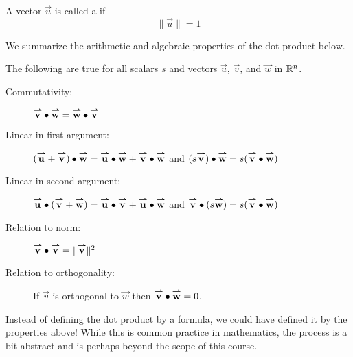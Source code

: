 \documentclass{ximera}
\begin{document}
\begin{definition}
  A vector $\vec{u}$ is called a  if
  \[
  \|\vec{u}\| = 1
  \]
\end{definition}






We summarize the arithmetic and algebraic properties of the dot
product below.
\begin{theorem}
  The following are true for all scalars $s$ and vectors
  $\vec{u}$, $\vec{v}$, and $\vec{w}$ in $\R^n$.
  \begin{description}
  \item[Commutativity:] $\vec{v} \dotp \vec{w} = \vec{w} \dotp
    \vec{v}$
  \item[Linear in first argument:] $(\vec{u}+\vec{v})\dotp \vec{w} = \vec{u}\dotp \vec{w} +
    \vec{v}\dotp \vec{w}$ and $(s\vec{v})\dotp \vec{w} = s(\vec{v}
    \dotp \vec{w})$
  \item[Linear in second argument:] $\vec{u} \dotp (\vec{v}+\vec{w}) = \vec{u}\dotp \vec{v}+
    \vec{u}\dotp \vec{w}$ and $\vec{v} \dotp (s\vec{w}) = s(\vec{v}
    \dotp \vec{w})$
  \item[Relation to norm:] $\vec{v} \dotp \vec{v} = \|\vec{v}\|^2$
  \item[Relation to orthogonality:] If $\vec{v}$ is orthogonal to
    $\vec{w}$ then $\vec{v} \dotp \vec{w} = 0$.
  \end{description}
\end{theorem}
 
Instead of defining the dot product by a formula, we could have
defined it by the properties above!  While this is common practice in
mathematics, the process is a bit abstract and is perhaps beyond the scope of
this course. 
\end{document}

